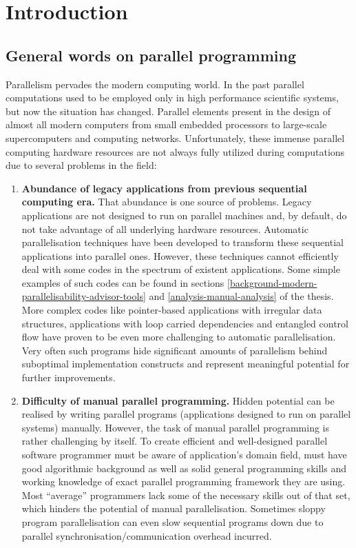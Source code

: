 \chapter{Introduction}
\label{introduction}
\section{General words on parallel programming}
\qquad Parallelism pervades the modern computing world. In the past parallel computations used to be employed only in high performance scientific systems, but now the situation has changed. Parallel elements present in the design of almost all modern computers from small embedded processors to large-scale supercomputers and computing networks. Unfortunately, these immense parallel computing hardware resources are not always fully utilized during computations due to several problems in the field:

\begin{enumerate}[align=left,leftmargin=*]
\item \textbf{Abundance of legacy applications from previous sequential computing era.} That abundance is one source of problems. Legacy applications are not designed to run on parallel machines and, by default, do not take advantage of all underlying hardware resources. Automatic parallelisation techniques have been developed to transform these sequential applications into parallel ones. However, these techniques cannot efficiently deal with some codes in the spectrum of existent applications. Some simple examples of such codes can be found in sections \ref{background-modern-parallelisability-advisor-tools} and \ref{analysis-manual-analysis} of the thesis. More complex codes like pointer-based applications with irregular data structures, applications with loop carried dependencies and entangled control flow have proven to be even more challenging to automatic parallelisation. Very often such programs hide significant amounts of parallelism behind suboptimal implementation constructs and represent meaningful potential for further improvements.
	
\item \textbf{Difficulty of manual parallel programming.} Hidden potential can be realised by writing parallel programs (applications designed to run on parallel systems) manually. However, the task of manual parallel programming is rather challenging by itself. To create efficient and well-designed parallel software programmer must be aware of application's domain field, must have good algorithmic background as well as solid general programming skills and working knowledge of exact parallel programming framework they are using. Most “average” programmers lack some of the necessary skills out of that set, which hinders the potential of manual parallelisation. Sometimes sloppy program parallelisation can even slow sequential programs down due to parallel synchronisation/communication overhead incurred.

\end{enumerate}


